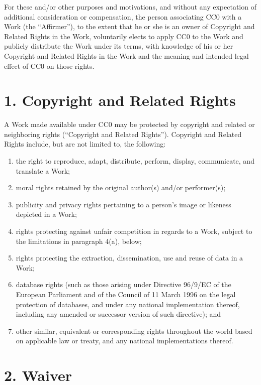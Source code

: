 \documentclass[a4paper,10pt,oneside]{book}
\begin{document}
For these and/or other purposes and motivations, and without any
expectation of additional consideration or compensation, the person
associating CC0 with a Work (the ``Affirmer''), to the extent that he or she
is an owner of Copyright and Related Rights in the Work, voluntarily
elects to apply CC0 to the Work and publicly distribute the Work under its
terms, with knowledge of his or her Copyright and Related Rights in the
Work and the meaning and intended legal effect of CC0 on those rights.

\section*{1. Copyright and Related Rights}

A Work made available under CC0 may be
protected by copyright and related or neighboring rights (``Copyright and
Related Rights''). Copyright and Related Rights include, but are not
limited to, the following:

\begin{enumerate}[label=\roman*.]
	\item the right to reproduce, adapt, distribute, perform, display,
	communicate, and translate a Work;
	\item moral rights retained by the original author(s) and/or performer(s);
	\item publicity and privacy rights pertaining to a person's image or
	likeness depicted in a Work;
	\item rights protecting against unfair competition in regards to a Work,
	subject to the limitations in paragraph 4(a), below;
	\item rights protecting the extraction, dissemination, use and reuse of data
	in a Work;
	\item database rights (such as those arising under Directive 96/9/EC of the
	European Parliament and of the Council of 11 March 1996 on the legal
	protection of databases, and under any national implementation
	thereof, including any amended or successor version of such
	directive); and
	\item other similar, equivalent or corresponding rights throughout the
	world based on applicable law or treaty, and any national
	implementations thereof.
\end{enumerate}

\section*{2. Waiver}
\end{document}
